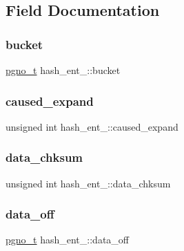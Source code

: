 \subsection{Field Documentation}
\mbox{\label{structhash__ent___ae2b9802542ef673d965ee83cb4d755f2}} 
\subsubsection{\texorpdfstring{bucket}{bucket}}
{\footnotesize\ttfamily \mbox{\hyperlink{other__libs_2filedb_2filehash_2ffdb__db_8h_a000813331643d38481142bcce7de1501}{pgno\+\_\+t}} hash\+\_\+ent\+\_\+\+::bucket}

\mbox{\label{structhash__ent___ad466c754efc662c05b8d952ec59314c7}} 
\subsubsection{\texorpdfstring{caused\_expand}{caused\_expand}}
{\footnotesize\ttfamily unsigned int hash\+\_\+ent\+\_\+\+::caused\+\_\+expand}

\mbox{\label{structhash__ent___ac8938cc10c673879a50a0f291713683e}} 
\subsubsection{\texorpdfstring{data\_chksum}{data\_chksum}}
{\footnotesize\ttfamily unsigned int hash\+\_\+ent\+\_\+\+::data\+\_\+chksum}

\mbox{\label{structhash__ent___aeddaa6eeb9c67da3640950876fa466ba}} 
\subsubsection{\texorpdfstring{data\_off}{data\_off}}
{\footnotesize\ttfamily \mbox{\hyperlink{other__libs_2filedb_2filehash_2ffdb__db_8h_a000813331643d38481142bcce7de1501}{pgno\+\_\+t}} hash\+\_\+ent\+\_\+\+::data\+\_\+off}

